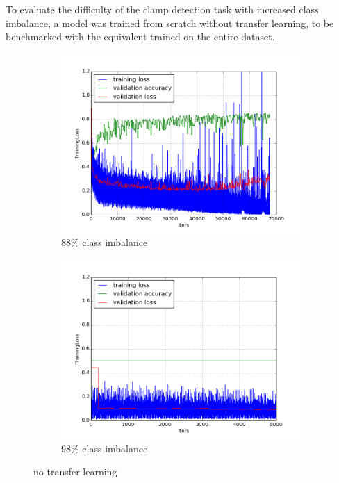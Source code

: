 \documentclass[a4paper,11pt]{article}
\begin{document}
To evaluate the difficulty of the clamp detection task with increased class imbalance, a model was trained from scratch without transfer learning, to be benchmarked with the equivalent trained on the entire dataset. 

\begin{figure}
    \centering
    \begin{minipage}[b]{\textwidth}
      \begin{subfigure}{.5\textwidth} 
        \centering
        \includegraphics[scale=0.4]{images/plot_clampdet_tl_wout.png}
        \caption{88\% class imbalance}\label{fig:2a}
      \end{subfigure}%
      \begin{subfigure}{.5\textwidth} 
        \centering
        \includegraphics[scale=0.4]{images/plot_clampdetCI98_tl_wout.png}
        \caption{98\% class imbalance}\label{fig:2b}
      \end{subfigure} \par \vspace*{20pt} %
      \caption{no transfer learning}\label{fig:2}
    \end{minipage}%
\end{figure}
\end{document}
